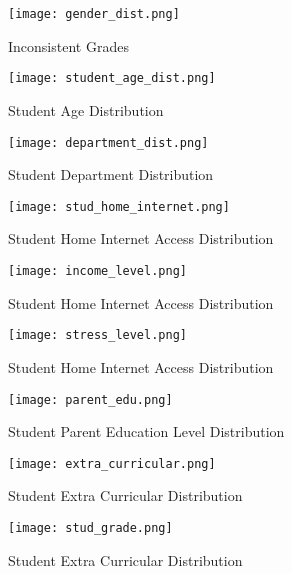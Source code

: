 \begin{figure}
	\centering %
	\texttt{[image: gender\_dist.png]}
	\caption{Inconsistent Grades \label{fig:gender_dist}}
\end{figure}

\begin{figure}
	\centering %
	\texttt{[image: student\_age\_dist.png]}
	\caption{Student Age Distribution \label{fig:stud_age_dist}}
\end{figure}

\begin{figure}
	\centering %
	\texttt{[image: department\_dist.png]}
	\caption{Student Department Distribution \label{fig:dept_dist}}
\end{figure}

\begin{figure}
	\centering %
	\texttt{[image: stud\_home\_internet.png]}
	\caption{Student Home Internet Access Distribution \label{fig:stud_home_internet}}
\end{figure}

\begin{figure}
	\centering %
	\texttt{[image: income\_level.png]}
	\caption{Student Home Internet Access Distribution \label{fig:income_level}}
\end{figure}


\begin{figure}
	\centering %
	\texttt{[image: stress\_level.png]}
	\caption{Student Home Internet Access Distribution \label{fig:stress_level}}
\end{figure}


\begin{figure}
	\centering %
	\texttt{[image: parent\_edu.png]}
	\caption{Student Parent Education Level Distribution \label{fig:parent_edu}}
\end{figure}

\begin{figure}
	\centering %
	\texttt{[image: extra\_curricular.png]}
	\caption{Student Extra Curricular Distribution \label{fig:extra_curricular}}
\end{figure}

\begin{figure}
	\centering %
	\texttt{[image: stud\_grade.png]}
	\caption{Student Extra Curricular Distribution \label{fig:stud_grade}}
\end{figure}

